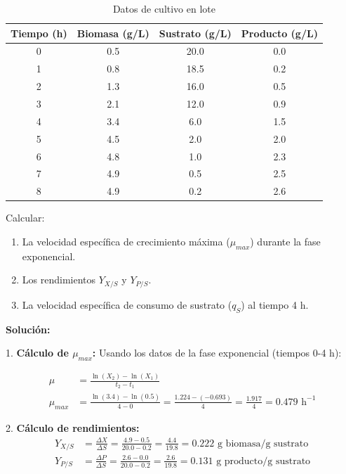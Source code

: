 \begin{table}\centering
    \caption{Datos de cultivo en lote}
    \label{tab:datos_cultivo}
    \begin{tabular}{c|c|c|c}
        \textbf{Tiempo (h)} & \textbf{Biomasa (g/L)} & \textbf{Sustrato (g/L)} & \textbf{Producto (g/L)} \\
        \hline
        0 & 0.5 & 20.0 & 0.0 \\
        1 & 0.8 & 18.5 & 0.2 \\
        2 & 1.3 & 16.0 & 0.5 \\
        3 & 2.1 & 12.0 & 0.9 \\
        4 & 3.4 & 6.0 & 1.5 \\
        5 & 4.5 & 2.0 & 2.0 \\
        6 & 4.8 & 1.0 & 2.3 \\
        7 & 4.9 & 0.5 & 2.5 \\
        8 & 4.9 & 0.2 & 2.6 \\
    \end{tabular}
\end{table}

Calcular:

\begin{enumerate}
    \item La velocidad específica de crecimiento máxima ($\mu_{max}$) durante la fase exponencial.
    \item Los rendimientos $Y_{X/S}$ y $Y_{P/S}$.
    \item La velocidad específica de consumo de sustrato ($q_S$) al tiempo 4 h.
\end{enumerate}

\textbf{Solución:}

1. \textbf{Cálculo de $\mu_{max}$:} Usando los datos de la fase exponencial (tiempos 0-4 h):

\begin{align*}
    \mu &= \frac{\ln(X_2) - \ln(X_1)}{t_2 - t_1} \\
    \mu_{max} &= \frac{\ln(3.4) - \ln(0.5)}{4 - 0} = \frac{1.224 - (-0.693)}{4} = \frac{1.917}{4} = 0.479 \text{ h}^{-1}
\end{align*}

2. \textbf{Cálculo de rendimientos:}
\begin{align*}
    Y_{X/S} &= \frac{\Delta X}{\Delta S} = \frac{4.9 - 0.5}{20.0 - 0.2} = \frac{4.4}{19.8} = 0.222 \text{ g biomasa/g sustrato} \\
    Y_{P/S} &= \frac{\Delta P}{\Delta S} = \frac{2.6 - 0.0}{20.0 - 0.2} = \frac{2.6}{19.8} = 0.131 \text{ g producto/g sustrato}
\end{align*}

